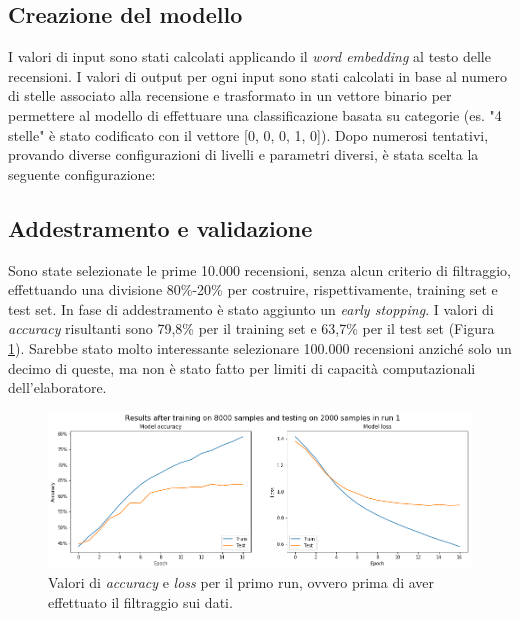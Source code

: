 \documentclass[12pt]{article}
\begin{document}
\subsection{Creazione del modello}
I valori di input sono stati calcolati applicando il \textit{word embedding} al testo delle recensioni. I valori di output per ogni input sono stati calcolati in base al numero di stelle associato alla recensione e trasformato in un vettore binario per permettere al modello di effettuare una classificazione basata su categorie (es. "4 stelle" è stato codificato con il vettore [0, 0, 0, 1, 0]). \newline
Dopo numerosi tentativi, provando diverse configurazioni di livelli e parametri diversi, è stata scelta la seguente configurazione:


\subsection{Addestramento e validazione}
Sono state selezionate le prime 10.000 recensioni, senza alcun criterio di filtraggio, effettuando una divisione 80\%-20\% per costruire, rispettivamente, training set e test set. In fase di addestramento è stato aggiunto un \textit{early stopping}. \newline
I valori di \textit{accuracy} risultanti sono 79,8\% per il training set e   63,7\% per il test set (Figura \ref{fig:run1}).
Sarebbe stato molto interessante selezionare 100.000 recensioni anziché solo un decimo di queste, ma non è stato fatto per limiti di capacità computazionali dell'elaboratore.

\begin{figure}[H]
\centering
\includegraphics[width=\textwidth]{images/accuracy_loss_run1.png}
\caption{Valori di \textit{accuracy} e \textit{loss} per il primo run, ovvero prima di aver effettuato il filtraggio sui dati.}
\label{fig:run1}
\end{figure}
\end{document}

